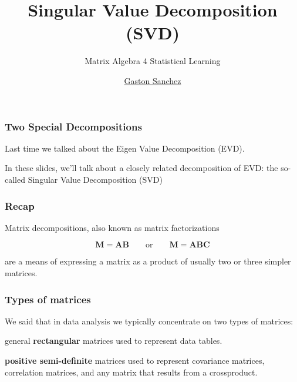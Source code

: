 \documentclass[12pt]{beamer}\usepackage[]{graphicx}\usepackage[]{color}
\title{Singular Value Decomposition (SVD)}
\subtitle{Matrix Algebra 4 Statistical Learning}
\author{\href{http://www.gastonsanchez.com}{Gaston Sanchez}}
\institute{\href{https://creativecommons.org/licenses/by-sa/4.0/}{\tt \scriptsize \color{foreground} CC BY-SA 4.0}}
\date{}
\begin{document}
{
  \frame{\titlepage} 
}


\begin{frame}
\begin{center}
\Huge{}
\end{center}
\end{frame}


\begin{frame}
\frametitle{Two Special Decompositions}

Last time we talked about the Eigen Value Decomposition (EVD).

\bigskip
In these slides, we'll talk about a closely related decomposition of EVD:
the so-called {\hilit Singular Value Decomposition (SVD)}

\end{frame}


\begin{frame}[fragile]
\frametitle{Recap}

Matrix decompositions, also known as matrix factorizations

{\Large
$$
\mathbf{M = A B} \qquad \text{or} \qquad \mathbf{M = A B C}
$$
}

are a means of expressing a matrix as a product 
of usually two or three {\hilit simpler} matrices.

\end{frame}


\begin{frame}
\frametitle{Types of matrices}

We said that in data analysis we typically concentrate on two types of matrices:
\eb

\bbi
 \item general \textbf{rectangular} matrices used to represent data tables.
 \item \textbf{positive semi-definite} matrices used to represent covariance matrices, 
correlation matrices, and any matrix that results from a crossproduct.
\ei

\end{frame}
\end{document}
